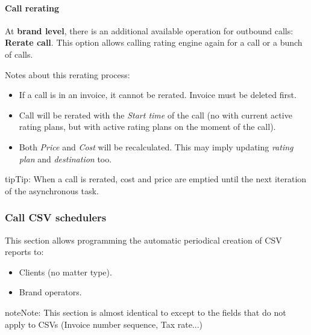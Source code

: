 \documentclass[letterpaper,10pt,english]{sphinxmanual}
\begin{document}
\paragraph{Call rerating}
\label{administration_portal/client/retail/calls/external_calls:call-rerating}
At \textbf{brand level}, there is an additional available operation for outbound calls: \textbf{Rerate call}. This option allows calling rating engine again for a call or a bunch of calls.

Notes about this rerating process:
\begin{itemize}
\item {} 
If a call is in an invoice, it cannot be rerated. Invoice must be deleted first.

\item {} 
Call will be rerated with the \emph{Start time} of the call (no with current active rating plans, but with active rating plans
on the moment of the call).

\item {} 
Both \emph{Price} and \emph{Cost} will be recalculated. This may imply updating \emph{rating plan} and \emph{destination} too.

\end{itemize}

\begin{notice}{tip}{Tip:}
When a call is rerated, cost and price are emptied until the next iteration of the asynchronous task.
\end{notice}


\subsubsection{Call CSV schedulers}
\label{administration_portal/client/retail/calls/call_csv_schedulers:call-csv-schedulers}\label{administration_portal/client/retail/calls/call_csv_schedulers::doc}
This section allows programming the automatic periodical creation of CSV reports to:
\begin{itemize}
\item {} 
Clients (no matter type).

\item {} 
Brand operators.

\end{itemize}

\begin{notice}{note}{Note:}
This section is almost identical to {\hyperref[administration_portal/brand/invoicing/invoice_schedulers:invoice\string-schedulers]{}} except to the
fields that do not apply to CSVs (Invoice number sequence, Tax rate...)
\end{notice}
\end{document}
